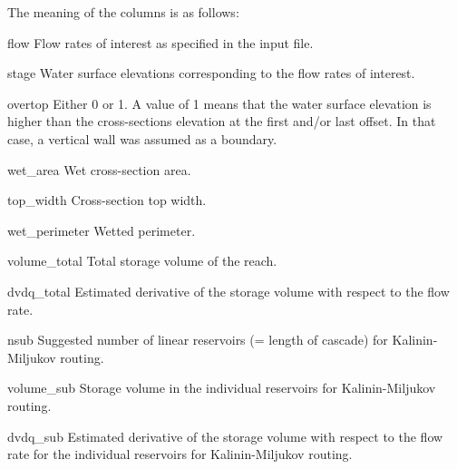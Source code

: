The meaning of the columns is as follows:
\begin{columndef}
  \item[flow] Flow rates of interest as specified in the input file.
  \item[stage] Water surface elevations corresponding to the flow rates of interest.
  \item[overtop] Either 0 or 1. A value of 1 means that the water surface elevation is higher than the cross-sections elevation at the first and/or last offset. In that case, a vertical wall was assumed as a boundary.
  \item[wet\_area] Wet cross-section area.
  \item[top\_width] Cross-section top width.
  \item[wet\_perimeter] Wetted perimeter.
  \item[volume\_total] Total storage volume of the reach.
  \item[dvdq\_total] Estimated derivative of the storage volume with respect to the flow rate.
  \item[nsub] Suggested number of linear reservoirs (= length of cascade) for Kalinin-Miljukov routing.
  \item[volume\_sub] Storage volume in the individual reservoirs for Kalinin-Miljukov routing.
  \item[dvdq\_sub] Estimated derivative of the storage volume with respect to the flow rate for the individual reservoirs for Kalinin-Miljukov routing. 
\end{columndef}
